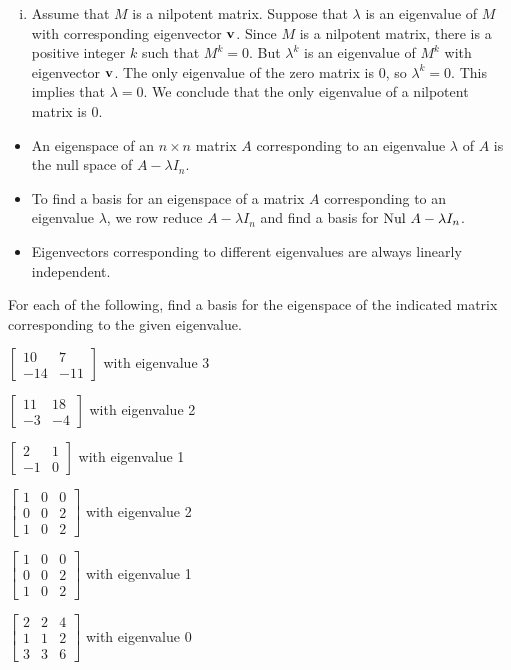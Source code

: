 \begin{example}
\begin{enumerate}[i.]
	\item Assume that $M$ is a nilpotent matrix. Suppose that $\lambda$ is an eigenvalue of $M$ with corresponding eigenvector $\mathbf{v}$. Since $M$ is a nilpotent matrix, there is a positive integer $k$ such that $M^k = 0$. But $\lambda^k$ is an eigenvalue of $M^k$ with eigenvector $\mathbf{v}$. The only eigenvalue of the zero matrix is $0$, so $\lambda^k = 0$. This implies that $\lambda = 0$. We conclude that the only eigenvalue of a nilpotent matrix is $0$. 
	
	\end{enumerate}

\ea
\end{example}


\begin{itemize}
\item An eigenspace of an $n \times n$ matrix $A$ corresponding to an eigenvalue $\lambda$ of $A$ is the null space of $A - \lambda I_n$. 
\item To find a basis for an eigenspace of a matrix $A$ corresponding to an eigenvalue $\lambda$, we row reduce $A - \lambda I_n$ and find a basis for $\text{Nul } A - \lambda I_n$. 
\item Eigenvectors corresponding to different eigenvalues are always linearly independent. 
\end{itemize}



\be
\item For each of the following, find a basis for the eigenspace of the indicated matrix corresponding to the given eigenvalue.
	\ba
	\item $\left[ \begin{array}{rr} 10&7 \\ -14&-11 \end{array} \right]$ with eigenvalue 3
	\item  $\left[ \begin{array}{rr} 11&18 \\ -3&-4 \end{array} \right]$ with eigenvalue 2
	\item $\left[ \begin{array}{rc} 2&1 \\ -1&0 \end{array} \right]$ with eigenvalue 1
	\item $\left[ \begin{array}{ccc} 1&0&0 \\ 0&0&2 \\ 1&0&2 \end{array} \right]$ with eigenvalue 2
	\item $\left[ \begin{array}{ccc} 1&0&0 \\ 0&0&2 \\ 1&0&2 \end{array} \right]$ with eigenvalue 1
	\item $\left[ \begin{array}{ccc} 2&2&4 \\ 1&1&2 \\ 3&3&6 \end{array} \right]$ with eigenvalue 0
	\ea

